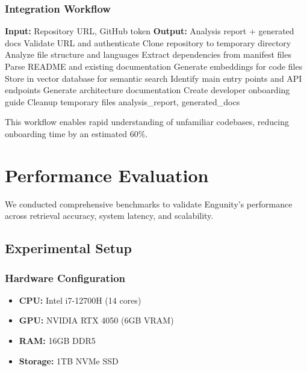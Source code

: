 \documentclass[conference]{IEEEtran}
\begin{document}
\subsubsection{Integration Workflow}

\begin{algorithm}[htbp]
\caption{GitHub Repository Analysis}
\label{alg:github}
\begin{algorithmic}[1]
\STATE \textbf{Input:} Repository URL, GitHub token
\STATE \textbf{Output:} Analysis report + generated docs
\STATE
\STATE Validate URL and authenticate
\STATE Clone repository to temporary directory
\STATE
\STATE Analyze file structure and languages
\STATE Extract dependencies from manifest files
\STATE Parse README and existing documentation
\STATE
\STATE Generate embeddings for code files
\STATE Store in vector database for semantic search
\STATE
\STATE Identify main entry points and API endpoints
\STATE Generate architecture documentation
\STATE Create developer onboarding guide
\STATE
\STATE Cleanup temporary files
\RETURN analysis\_report, generated\_docs
\end{algorithmic}
\end{algorithm}

This workflow enables rapid understanding of unfamiliar codebases, reducing onboarding time by an estimated 60\%.


\section{Performance Evaluation}

We conducted comprehensive benchmarks to validate Engunity's performance across retrieval accuracy, system latency, and scalability.

\subsection{Experimental Setup}

\subsubsection{Hardware Configuration}
\begin{itemize}
    \item \textbf{CPU:} Intel i7-12700H (14 cores)
    \item \textbf{GPU:} NVIDIA RTX 4050 (6GB VRAM)
    \item \textbf{RAM:} 16GB DDR5
    \item \textbf{Storage:} 1TB NVMe SSD
\end{itemize}
\end{document}
